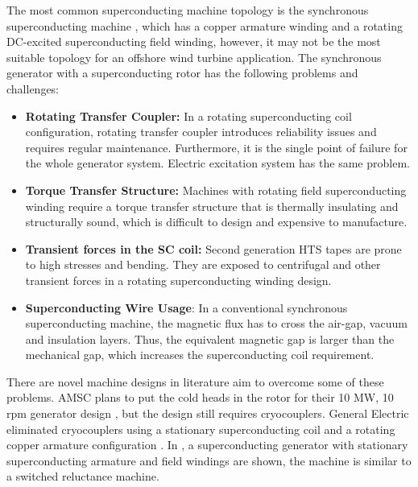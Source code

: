 \documentclass[12pt]{iopart}
\begin{document}
The most common superconducting machine topology is the synchronous superconducting machine \cite{Gamble2011, Kalsi2004h}, which has a copper armature winding and a rotating DC-excited superconducting field winding, however, it may not be the most suitable topology for an offshore wind turbine application. The synchronous generator with a superconducting rotor has the following problems and challenges:

\begin{itemize}

  \item \textbf{Rotating Transfer Coupler:} In a rotating superconducting coil configuration, rotating transfer coupler introduces reliability issues and requires regular maintenance. Furthermore, it is the single point of failure for the whole generator system. Electric excitation system has the same problem.

  \item \textbf{Torque Transfer Structure:} Machines with rotating field superconducting winding require a torque transfer structure that is thermally insulating and structurally sound, which is difficult to design and expensive to manufacture.

  \item \textbf{Transient forces in the SC coil:} Second generation HTS tapes are prone to high stresses and bending. They are exposed to centrifugal and other transient forces in a rotating superconducting winding design.
  
  \item \textbf{Superconducting Wire Usage}: In a conventional synchronous superconducting machine, the magnetic flux has to cross the air-gap, vacuum and insulation layers. Thus, the equivalent magnetic gap is larger than the mechanical gap, which increases the superconducting coil requirement.
  
\end{itemize}

There are novel machine designs in literature aim to overcome some of these problems. AMSC plans to put the cold heads in the rotor for their 10 MW, 10 rpm generator design \cite{amsc_presentation}, but the design still requires cryocouplers. General Electric eliminated cryocouplers using a stationary superconducting coil and a rotating copper armature configuration \cite{Stautner2012}. In \cite{Chen2014}, a superconducting generator with stationary superconducting armature and field windings are shown, the machine is similar to a switched reluctance machine.
\end{document}
